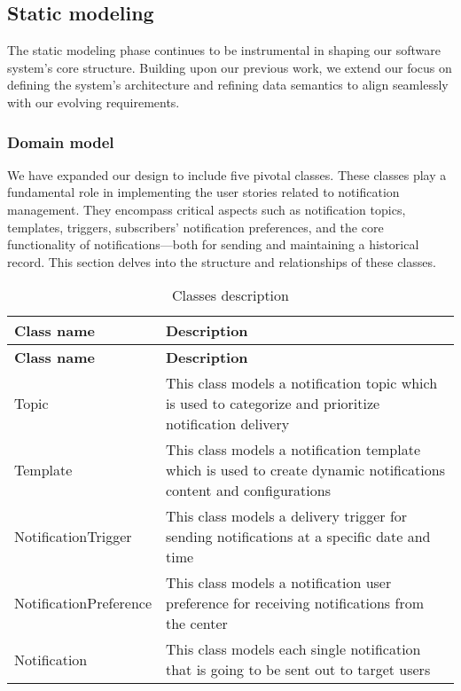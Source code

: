 \subsection{Static modeling}
The static modeling phase continues to be instrumental in shaping our software system's core structure.
Building upon our previous work, we extend our focus on defining the system's architecture and refining
data semantics to align seamlessly with our evolving requirements.

\subsubsection{Domain model}
We have expanded our design to include five pivotal classes. These classes play a fundamental role in
implementing the user stories related to notification management. They encompass critical aspects such
as notification topics, templates, triggers, subscribers' notification preferences, and the core
functionality of notifications—both for sending and maintaining a historical record. This section delves
into the structure and relationships of these classes. \\

\begin{longtable}{ | m{} | m{} | }
    \caption{Classes description}                                                                                                               \\
    \hline
    \textbf{Class name}    & \textbf{Description}                                                                                               \\
    \hline
    \endfirsthead
    \hline
    \textbf{Class name}    & \textbf{Description}                                                                                               \\
    \hline
    \endhead
    \endfoot
    \hline
    \endlastfoot
    Topic                  & This class models a notification topic which is used to categorize and prioritize notification delivery            \\
    \hline
    Template               & This class models a notification template which is used to create dynamic notifications content and configurations \\
    \hline
    NotificationTrigger    & This class models a delivery trigger for sending notifications at a specific date and time                         \\
    \hline
    NotificationPreference & This class models a notification user preference for receiving notifications from the center                       \\
    \hline
    Notification           & This class models each single notification that is going to be sent out to target users                            \\
    \hline
\end{longtable}

